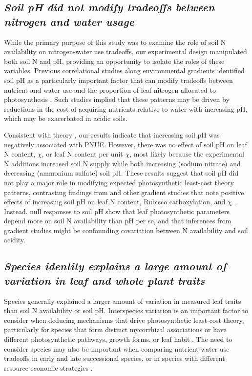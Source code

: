     \subsection{\textit{Soil pH did not modify tradeoffs between nitrogen and water usage}}

    While the primary purpose of this study was to examine the role of soil N availability on nitrogen-water use tradeoffs, our experimental design manipulated both soil N and pH, providing an opportunity to isolate the roles of these variables. Previous correlational studies along environmental gradients identified soil pH as a particularly important factor that can modify tradeoffs between nutrient and water use  and the proportion of leaf nitrogen allocated to photosynthesis . Such studies implied that these patterns may be driven by reductions in the cost of acquiring nutrients relative to water with increasing pH, which may be exacerbated in acidic soils.

    Consistent with theory , our results indicate that increasing soil pH was negatively associated with PNUE. However, there was no effect of soil pH on leaf N content, $\chi$, or leaf N content per unit $\chi$, most likely because the experimental N additions increased soil N supply while both increasing (sodium nitrate) and decreasing (ammonium sulfate) soil pH. These results suggest that soil pH did not play a major role in modifying expected photosynthetic least-cost theory patterns, contrasting findings from  and other gradient studies that note positive effects of increasing soil pH on leaf N content, Rubisco carboxylation, and $\chi$ . Instead, null responses to soil pH show that leaf photosynthetic parameters depend more on soil N availability than pH per se, and that inferences from gradient studies might be confounding covariation between N availability and soil acidity.

    \subsection{\textit{Species identity explains a large amount of variation in leaf and whole plant traits}}

    Species generally explained a larger amount of variation in measured leaf traits than soil N availability or soil pH. Interspecies variation is an important factor to consider when deducing mechanisms that drive photosynthetic least-cost theory, particularly for species that form distinct mycorrhizal associations or have different photosynthetic pathways, growth forms, or leaf habit . The need to consider species may also be important when comparing nutrient-water use tradeoffs in early and late successional species, or in species with different resource economic strategies .
    
